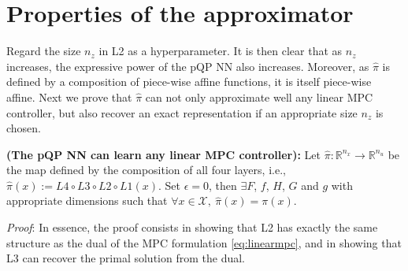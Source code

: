 \section{Properties of the approximator}
\label{sec.properties_approx}
Regard the size $n_z$ in L2 as a hyperparameter. It is then clear that as $n_z$ increases, the expressive power of the pQP NN also increases. Moreover, as $\hat\pi$ is defined by a composition of piece-wise affine functions, it is itself piece-wise affine. Next we prove that $\hat\pi$ can not only approximate well any linear MPC controller, but also recover an exact representation if an appropriate size $n_z$ is chosen.

\begin{theorem}
	\label{thm:pQPrepr}
	\textbf{(The pQP NN can learn any linear MPC controller):} Let $\hat{\pi}: \mathbb{R}^{n_x} \rightarrow \mathbb{R}^{n_u}$ be the map defined by the composition of all four layers, i.e., $\hat{\pi}(x) := L4 \circ L3 \circ L2 \circ L1(x)$. Set $\epsilon = 0$, then $\exists F$, $f$, $H$, $G$ and $g$ with appropriate dimensions such that $\forall x \in \mathcal{X}, \ \hat{\pi}(x) = \pi(x)$.
\end{theorem}

\textit{Proof}: In essence, the proof consists in showing that L2 has exactly the same structure as the dual of the MPC formulation \eqref{eq:linearmpc}, and in showing that L3 can recover the primal solution from the dual.

